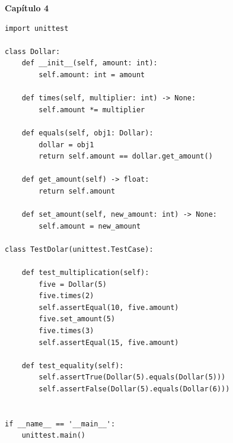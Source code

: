 \documentclass[a4paper,12pt]{article}
\newcommand{\capitulo}[1]{
    \vspace{1em}
    \noindent
    \colorbox{black!15}{
        \parbox{\dimexpr\linewidth-2\fboxsep}{
            \centering \Large \textbf{#1}
        }
    }
    \vspace{1em}
}
\begin{document}
\capitulo{Capítulo 4}
\begin{lstlisting}[style=pythonstyle]
import unittest

class Dollar:
    def __init__(self, amount: int):
        self.amount: int = amount

    def times(self, multiplier: int) -> None:
        self.amount *= multiplier

    def equals(self, obj1: Dollar):
        dollar = obj1
        return self.amount == dollar.get_amount()

    def get_amount(self) -> float:
        return self.amount

    def set_amount(self, new_amount: int) -> None:
        self.amount = new_amount

class TestDolar(unittest.TestCase):

    def test_multiplication(self):
        five = Dollar(5)
        five.times(2) 
        self.assertEqual(10, five.amount)
        five.set_amount(5)
        five.times(3) 
        self.assertEqual(15, five.amount)

    def test_equality(self):
        self.assertTrue(Dollar(5).equals(Dollar(5)))
        self.assertFalse(Dollar(5).equals(Dollar(6)))


if __name__ == '__main__':
    unittest.main()
\end{lstlisting}
\end{document}
